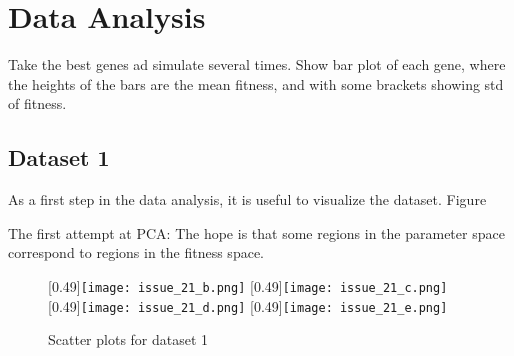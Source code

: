 
\chapter{Data Analysis} %

\label{chapter:model} %
	

Take the best genes ad simulate several times. Show bar plot of each gene, where the heights of the bars are the mean fitness, and with some brackets showing std of fitness.

\section{Dataset 1}

As a first step in the data analysis, it is useful to visualize the dataset. Figure 

The first attempt at PCA: The hope is that some regions in the parameter space correspond to regions in the fitness space. 
\begin{figure}
\centering
\subcaptionbox{\label{subfig:}}
[0.49\linewidth]{\texttt{[image: issue\_21\_b.png]}}
\subcaptionbox{\label{subfig:}}
[0.49\linewidth]{\texttt{[image: issue\_21\_c.png]}}
\subcaptionbox{\label{subfig:}}
[0.49\linewidth]{\texttt{[image: issue\_21\_d.png]}}
\subcaptionbox{\label{subfig:}}
[0.49\linewidth]{\texttt{[image: issue\_21\_e.png]}}

\caption{Scatter plots for dataset 1}\label{fig:scatter_plot_dataset1}




\end{figure}